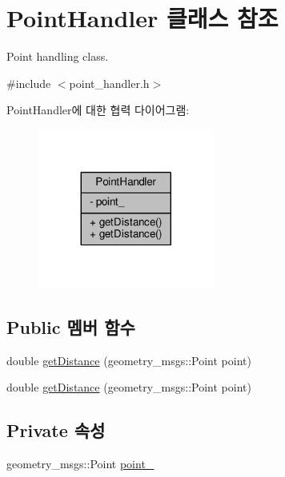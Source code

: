 \hypertarget{class_point_handler}{}\section{Point\+Handler 클래스 참조}
\label{class_point_handler}


Point handling class.  




{\ttfamily \#include $<$point\+\_\+handler.\+h$>$}



Point\+Handler에 대한 협력 다이어그램\+:\nopagebreak
\begin{figure}[H]
\begin{center}
\leavevmode
\includegraphics[width=164pt]{class_point_handler__coll__graph}
\end{center}
\end{figure}
\subsection*{Public 멤버 함수}
\begin{DoxyCompactItemize}
\item 
double \hyperlink{class_point_handler_ae5d42991d2fe2a2e89afc4defc9158e1}{get\+Distance} (geometry\+\_\+msgs\+::\+Point point)
\item 
double \hyperlink{class_point_handler_ae5d42991d2fe2a2e89afc4defc9158e1}{get\+Distance} (geometry\+\_\+msgs\+::\+Point point)
\end{DoxyCompactItemize}
\subsection*{Private 속성}
\begin{DoxyCompactItemize}
\item 
geometry\+\_\+msgs\+::\+Point \hyperlink{class_point_handler_ad95d3d370852a0dfb97f099e01934f6a}{point\+\_\+}
\end{DoxyCompactItemize}


